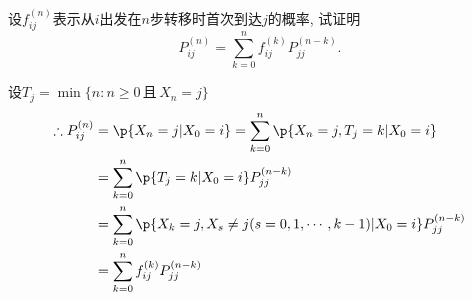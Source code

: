 \begin{problem}{3.9}
设$f^{(n)}_{ij}$表示从$i$出发在$n$步转移时首次到达$j$的概率, 试证明
\[P^{(n)}_{ij} = \sum^n_{k=0}f^{(k)}_{ij}P^{(n-k)}_{jj}.\]
\end{problem}
\begin{solution}[1]
	设$T_j = \min \{n: n \geqslant 0 \,\text{且}\, X_n = j\}$
	\[\begin{split}
			\therefore P^{(n)}_{ij} & = \p\{X_n = j | X_0 = i\} = \sum^n_{k=0}\p\{X_n = j, T_j = k | X_0 = i\}\\
			& = \sum^n_{k=0}\p\{T_j = k | X_0 = i\}P^{(n-k)}_{jj}\\
			& = \sum^n_{k=0}\p\{X_k = j, X_s\neq j(s = 0,1,\cdots, k-1) | X_0 = i\}P^{(n-k)}_{jj}\\
			& = \sum^n_{k=0}f^{(k)}_{ij} P^{(n-k)}_{jj}
		\end{split}\]
\end{solution}
